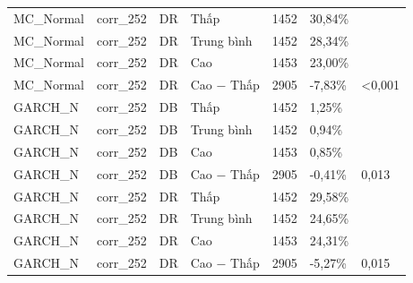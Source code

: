 \begin{longtable}{llllrll}
MC\_Normal & corr\_252 & DR & Thấp & 1452 & 30,84\% &  \\
MC\_Normal & corr\_252 & DR & Trung bình & 1452 & 28,34\% &  \\
MC\_Normal & corr\_252 & DR & Cao & 1453 & 23,00\% &  \\
MC\_Normal & corr\_252 & DR & Cao − Thấp & 2905 & -7,83\% & <0,001 \\
GARCH\_N & corr\_252 & DB & Thấp & 1452 & 1,25\% &  \\
GARCH\_N & corr\_252 & DB & Trung bình & 1452 & 0,94\% &  \\
GARCH\_N & corr\_252 & DB & Cao & 1453 & 0,85\% &  \\
GARCH\_N & corr\_252 & DB & Cao − Thấp & 2905 & -0,41\% & 0,013 \\
GARCH\_N & corr\_252 & DR & Thấp & 1452 & 29,58\% &  \\
GARCH\_N & corr\_252 & DR & Trung bình & 1452 & 24,65\% &  \\
GARCH\_N & corr\_252 & DR & Cao & 1453 & 24,31\% &  \\
GARCH\_N & corr\_252 & DR & Cao − Thấp & 2905 & -5,27\% & 0,015 \\
\end{longtable}
